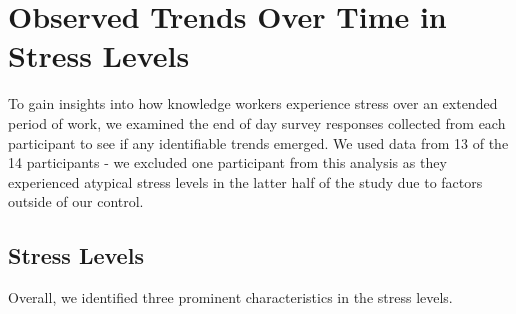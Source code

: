%



\section{Observed Trends Over Time in Stress  Levels}
\label{stressTrends}

To gain insights into how knowledge workers experience stress  over an
extended period of work, we examined the end of day survey responses
collected from each participant to see if any identifiable trends
emerged.  We used data from 13 of the 14 participants - we excluded one participant
from this analysis as they experienced atypical stress
levels in the latter half of the study due to factors outside of our
control.

\subsection{Stress Levels}
Overall, we identified three prominent characteristics in the stress levels.

